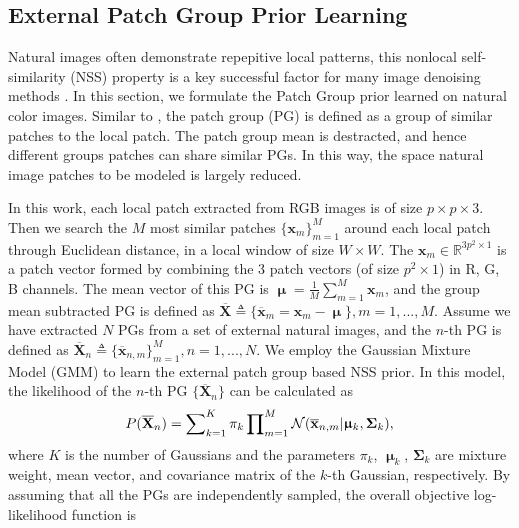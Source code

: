\documentclass[10pt,twocolumn,letterpaper]{article}
\begin{document}
\subsection{External Patch Group Prior Learning}

Natural images often demonstrate repepitive local patterns, this nonlocal self-similarity (NSS) property is a key successful factor for many image denoising methods \cite{nlm,bm3d,lssc,ncsr,wnnm,pgpd}. In this section, we formulate the Patch Group prior learned on natural color images. Similar to \cite{pgpd}, the patch group (PG) is defined as a group of similar patches to the local patch. The patch group mean is destracted, and hence different groups patches can share similar PGs. In this way, the space natural image patches to be modeled is largely reduced. 

In this work, each local patch extracted from RGB images is of size $p\times p \times 3$. Then we search the $M$ most similar patches $\{\mathbf{x}_{m}\}_{m=1}^{M}$ around each local patch through Euclidean distance, in a local window of size $W\times W$. The $\mathbf{x}_{m}\in \mathbb{R}^{3p^{2}\times1}$ is a patch vector formed by combining the 3 patch vectors (of size $p^{2}\times 1$) in R, G, B channels. The mean vector of this PG is $\boldsymbol{\upmu}=\frac{1}{M}\sum_{m=1}^{M}\mathbf{x}_{m}$, and the group mean subtracted PG is defined as $\mathbf{\overline{X}}\triangleq \{\mathbf{\overline{x}}_{m}=\mathbf{x}_{m}-\boldsymbol{\upmu}\}, m=1,...,M$. Assume we have extracted $N$ PGs from a set of external natural images, and the $n$-th PG is defined as $\mathbf{\overline{X}}_{n}\triangleq \{\mathbf{\overline{x}}_{n,m}\}_{m=1}^{M}, n=1,...,N$. We employ the Gaussian Mixture Model (GMM) to learn the external patch group based NSS prior. In this model, the likelihood of the $n$-th PG $\{\mathbf{\overline{X}}_{n}\}$ can be calculated as
\vspace{-2mm}
\begin{equation}\label{equ1}\vspace{-2mm}
P(\mathbf{\overline{X}}_{n})  = \sum\nolimits_{k=1}^{K}\pi_{k}\prod\nolimits_{m=1}^{M}\mathcal{N}(\mathbf{\overline{x}}_{n,m}|\boldsymbol{\upmu}_{k},\mathbf{\Sigma}_{k}),
\end{equation}
where $K$ is the number of Gaussians and the parameters $\pi_{k}$, $\boldsymbol{\upmu}_{k}$, $\mathbf{\Sigma}_{k}$ are mixture weight, mean vector, and covariance matrix of the $k$-th Gaussian, respectively. By assuming that all the PGs are independently sampled, the overall objective log-likelihood function is
\end{document}
